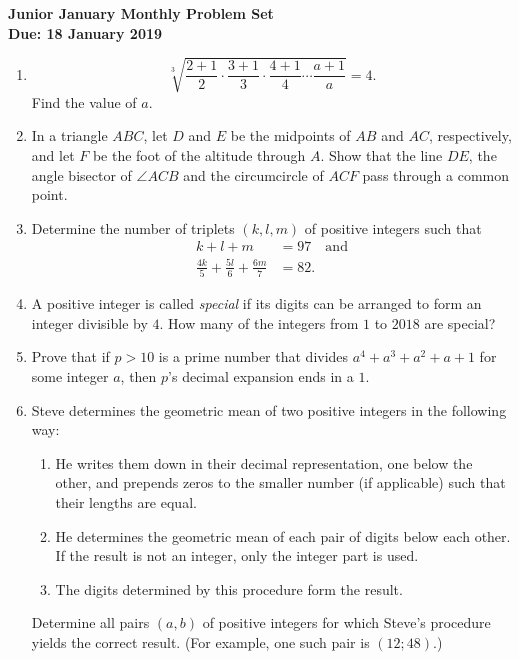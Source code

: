 \documentclass{article}
\begin{document}
\begin{center}
\textbf{\Large Junior January Monthly Problem Set}
\\ \vspace{1em}
\textbf{\large Due: 18 January 2019}
\end{center}

\vspace{12pt}

\begin{enumerate}[1.]

\item %
\[ \sqrt[3]{\frac{2+1}{2}\cdot\frac{3+1}{3}\cdot\frac{4+1}{4}\dotsm\frac{a+1}{a}} = 4. \]
Find the value of $a$.


\item %
In a triangle $ABC$, let $D$ and $E$ be the midpoints of $AB$ and $AC$, respectively, and let $F$ be the foot of the altitude through $A$. Show that the line $DE$, the angle bisector of $\angle ACB$ and the circumcircle of $ACF$ pass through a common point.


\item %
Determine the number of triplets $(k,l,m)$ of positive integers such that
\begin{align*}
  k+l+m &= 97 \quad \mathrm{and} \\
  \frac{4k}{5} +\frac{5l}{6} +\frac{6m}{7} &= 82.
\end{align*}


\item %
A positive integer is called \emph{special} if its digits can be arranged to form an integer divisible by $4$. How many of the integers from $1$ to $2018$ are special?


\item %
Prove that if $p > 10$ is a prime number that divides $a^4+a^3+a^2+a+1$ for some integer $a$, then $p$'s decimal expansion ends in a $1$.


\item %
Steve determines the geometric mean of two positive integers in the following way:
\begin{enumerate}
	\item He writes them down in their decimal representation, one below the other, and prepends zeros to the smaller number (if applicable) such that their lengths are equal.
	\item He determines the geometric mean of each pair of digits below each other. If the result is not an integer, only the integer part is used.
	\item The digits determined by this procedure form the result.
\end{enumerate}
Determine all pairs $(a,b)$ of positive integers for which Steve's procedure yields the correct result. (For example, one such pair is $(12; 48)$.)



\end{enumerate}
\end{document}

